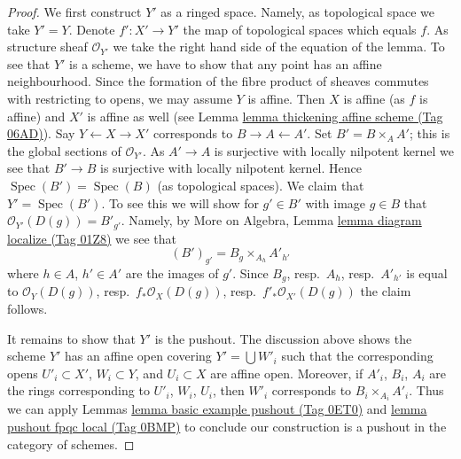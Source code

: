 \documentclass{amsart}
\theoremstyle{plain}
\theoremstyle{definition}
\theoremstyle{remark}
\numberwithin{equation}{subsection}
\def\Spec{\mathop{\mathrm{Spec}}}
\begin{document}
\begin{proof}
We first construct $Y'$ as a ringed space. Namely, as topological
space we take $Y' = Y$. Denote $f' : X' \to Y'$ the map of topological
spaces which equals $f$. As structure sheaf $\mathcal{O}_{Y'}$ we take
the right hand side of the equation of the lemma. To see that
$Y'$ is a scheme, we have to show that any point has an affine
neighbourhood. Since the formation of the fibre product of sheaves
commutes with restricting to opens, we may assume $Y$ is affine.
Then $X$ is affine (as $f$ is affine) and $X'$ is affine as well
(see Lemma \href{https://stacks.math.columbia.edu/tag/06AD}{lemma thickening affine scheme (Tag 06AD)}).
Say $Y \leftarrow X \rightarrow X'$ corresponds
to $B \rightarrow A \leftarrow A'$. Set $B' = B \times_A A'$; this
is the global sections of $\mathcal{O}_{Y'}$. As $A' \to A$ is surjective
with locally nilpotent kernel we see that $B' \to B$ is surjective
with locally nilpotent kernel. Hence $\Spec(B') = \Spec(B)$ (as
topological spaces). We claim that $Y' = \Spec(B')$. To see this
we will show for $g' \in B'$ with image $g \in B$ that
$\mathcal{O}_{Y'}(D(g)) = B'_{g'}$. Namely, by
More on Algebra, Lemma \href{https://stacks.math.columbia.edu/tag/01Z8}{lemma diagram localize (Tag 01Z8)} we see that
$$
(B')_{g'} = B_g \times_{A_h} A'_{h'}
$$
where $h \in A$, $h' \in A'$ are the images of $g'$. Since
$B_g$, resp.\ $A_h$, resp.\ $A'_{h'}$ is equal to $\mathcal{O}_Y(D(g))$,
resp.\ $f_*\mathcal{O}_X(D(g))$, resp.\ $f'_*\mathcal{O}_{X'}(D(g))$ the
claim follows.

\medskip\noindent
It remains to show that $Y'$ is the pushout.
The discussion above shows the scheme $Y'$
has an affine open covering $Y' = \bigcup W'_i$
such that the corresponding opens
$U'_i \subset X'$, $W_i \subset Y$, and
$U_i \subset X$ are affine open.
Moreover, if $A'_i$, $B_i$, $A_i$ are the rings corresponding to
$U'_i$, $W_i$, $U_i$, then
$W'_i$ corresponds to $B_i \times_{A_i} A'_i$.
Thus we can apply Lemmas \href{https://stacks.math.columbia.edu/tag/0ET0}{lemma basic example pushout (Tag 0ET0)} and
\href{https://stacks.math.columbia.edu/tag/0BMP}{lemma pushout fpqc local (Tag 0BMP)} to conclude our construction is a pushout
in the category of schemes.
\end{proof}
\end{document}
